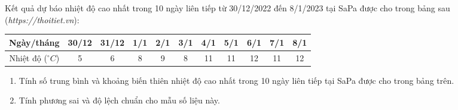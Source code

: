 \begin{bt}%
Kết quả dự báo nhiệt độ cao nhất trong 10 ngày liên tiếp từ 30/12/2022 đến 8/1/2023 tại SaPa được cho trong bảng sau (\textit{https://thoitiet.vn}):
\begin{center}
	\begin{tabular}{|c|c|c|c|c|c|c|c|c|c|c|}
\hline
Ngày/tháng &30/12&31/12&1/1&2/1&3/1&4/1&5/1&6/1&7/1&8/1 \\
\hline
Nhiệt độ ($^\circ C$)& 5 & 6 & 8 & 9 & 8 & 11 & 11 & 12 & 11 & 12 \\
\hline
\end{tabular}
\end{center}
\begin{enumerate}
\item Tính số trung bình và khoảng biến thiên nhiệt độ cao nhất trong 10 ngày liên tiếp tại SaPa được cho trong bảng trên.
\item Tính phương sai và độ lệch chuẩn cho mẫu số liệu này.
\end{enumerate}
\end{bt}

